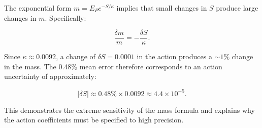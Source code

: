 The exponential form \(m = E_P e^{-S/\kappa}\) implies that small changes in
\(S\) produce large changes in \(m\).  Specifically:

\[
\frac{\delta m}{m} = -\frac{\delta S}{\kappa}.
\]

Since \(\kappa \approx 0.0092\), a change of \(\delta S = 0.0001\) in the
action produces a \(\sim 1\%\) change in the mass.  The 0.48\% mean error
therefore corresponds to an action uncertainty of approximately:

\[
|\delta S| \approx 0.48\% \times 0.0092 \approx 4.4 \times 10^{-5}.
\]

This demonstrates the extreme sensitivity of the mass formula and explains
why the action coefficients must be specified to high precision.
